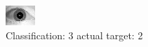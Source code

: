 \begin{figure}[h!]
\begin{center}
\includegraphics[width=0.60\columnwidth]{figures/ID1638_class_3_target_2.png}
\end{center}
\caption{ Classification: 3 actual target: 2}
\label{fig:ID1638_class_3_target_2}
\end{figure}
